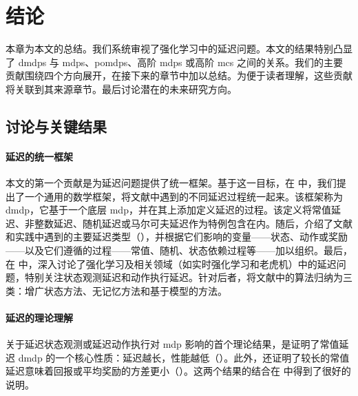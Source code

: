 \chapter{结论}
\label{chap:conclusion}

本章为本文的总结。我们系统审视了强化学习中的延迟问题。本文的结果特别凸显了 \glspl{dmdp} 与 \glspl{mdp}、\glspl{pomdp}、高阶 \glspl{mdp} 或高阶 \glspl{mc} 之间的关系。我们的主要贡献围绕四个方向展开，在接下来的章节中加以总结。为便于读者理解，这些贡献将关联到其来源章节。最后讨论潜在的未来研究方向。

\section{讨论与关键结果}
\subsubsection{延迟的统一框架}
本文的第一个贡献是为延迟问题提供了统一框架。基于这一目标，在  中，我们提出了一个通用的数学框架，将文献中遇到的不同延迟过程统一起来。该框架称为 \gls{dmdp}，它基于一个底层 \gls{mdp}，并在其上添加定义延迟的过程。该定义将常值延迟、非整数延迟、随机延迟或马尔可夫延迟作为特例包含在内。随后，介绍了文献和实践中遇到的主要延迟类型（），并根据它们影响的变量——状态、动作或奖励——以及它们遵循的过程——常值、随机、状态依赖过程等——加以组织。最后，在  中，深入讨论了强化学习及相关领域（如实时强化学习和老虎机）中的延迟问题，特别关注状态观测延迟和动作执行延迟。针对后者，将文献中的算法归纳为三类：增广状态方法、无记忆方法和基于模型的方法。

\subsubsection{延迟的理论理解}
关于延迟状态观测或延迟动作执行对 \gls{mdp} 影响的首个理论结果，是证明了常值延迟 \gls{dmdp} 的一个核心性质：延迟越长，性能越低（）。此外，还证明了较长的常值延迟意味着回报或平均奖励的方差更小（）。这两个结果的结合在  中得到了很好的说明。


